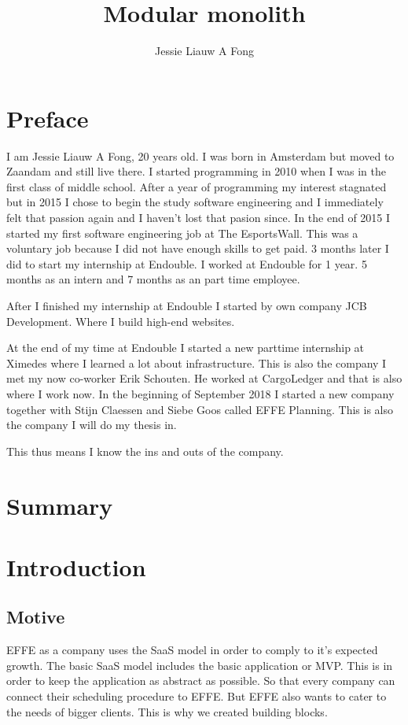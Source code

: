 \documentclass{report}
\title{Modular monolith}
\author{Jessie Liauw A Fong}
\begin{document}
\maketitle
\tableofcontents

\chapter{Preface}
I am Jessie Liauw A Fong, 20 years old. I was born in Amsterdam but moved to Zaandam and still live there. I started programming in 2010 when I was in the first class of middle school. After a year of programming my interest stagnated but in 2015 I chose to begin the study software engineering and I immediately felt that passion again and I haven’t lost that pasion since. In the end of 2015 I started my first software engineering job at The EsportsWall. This was a voluntary job because I did not have enough skills to get paid. 3 months later I did to start my internship at Endouble. I worked at Endouble for 1 year. 5 months as an intern and 7 months as an part time employee.

After I finished my internship at Endouble I started by own company JCB Development. Where I build high-end websites.

At the end of my time at Endouble I started a new parttime internship at Ximedes where I learned a lot about infrastructure. This is also the company I met my now co-worker Erik Schouten. He worked at CargoLedger and that is also where I work now. In the beginning of September 2018 I started a new company together with Stijn Claessen and Siebe Goos called EFFE Planning. This is also the company I will do my thesis in.

This thus means I know the ins and outs of the company.

\chapter{Summary}

\chapter{Introduction}

\section{Motive}
EFFE as a company uses the SaaS model in order to comply to it’s expected growth. The basic SaaS model includes the basic application or MVP. This is in order to keep the application as abstract as possible. So that every company can connect their scheduling procedure to EFFE. But EFFE also wants to cater to the needs of bigger clients. This is why we created building blocks.
\end{document}
